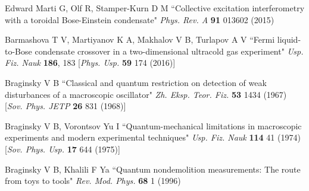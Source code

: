 \documentclass[pra,letterpaper,twocolumn,showpacs,superscriptaddress]{revtex4}
\begin{document}
\begin{thebibliography}{300}
 Edward Marti G, Olf R, Stamper-Kurn D M
``Collective excitation interferometry with a toroidal Bose-Einstein condensate"
{\it Phys. Rev. A} \textbf{91} 013602 (2015) 

 Barmashova T V, Martiyanov K A, Makhalov V B, Turlapov A V
``Fermi liquid-to-Bose condensate crossover in a two-dimensional ultracold gas experiment"
{\it Usp. Fiz. Nauk} \textbf{186}, 183 [{\it Phys. Usp.} \textbf{59} 174 (2016)]

 Braginsky V B 
``Classical and quantum restriction on detection of weak disturbances of a macroscopic oscillator"
{\it Zh. Eksp. Teor. Fiz.} \textbf{53} 1434 (1967) [{\it Sov. Phys. JETP} \textbf{26} 831 (1968)]

 Braginsky V B, Vorontsov Yu I 
``Quantum-mechanical limitations in macroscopic experiments and modern experimental techniques"
{\it Usp. Fiz. Nauk} \textbf{114} 41 (1974) [{\it Sov. Phys. Usp.} \textbf{17} 644 (1975)]

 Braginsky V B, Khalili F Ya 
``Quantum nondemolition measurements: The route from toys to tools" 
{\it Rev. Mod. Phys.} \textbf{68} 1 (1996)

\end{thebibliography}
\end{document}
